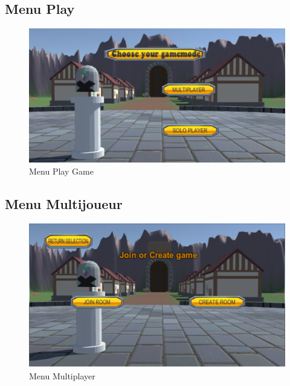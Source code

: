 \documentclass[a4paper, 11pt]{article}
\begin{document}
	\clearpage
	
	\subsection{Menu Play}
	\begin{figure}[!ht]
		\centering
		\includegraphics[scale=0.3]{images/play.png}
		\caption{Menu Play Game}
	\end{figure}
	
	\subsection{Menu Multijoueur}
	\begin{figure}[!ht]
		\centering
		\includegraphics[scale=0.3]{images/multiplayer.png}
		\caption{Menu Multiplayer}
	\end{figure}
	
	\clearpage
	
\end{document}
